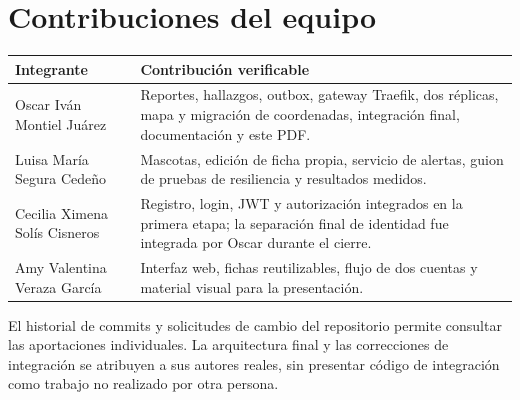 \documentclass[11pt,letterpaper]{article}
\begin{document}
\section{Contribuciones del equipo}
\small\begin{tabularx}{\textwidth}{@{}p{3.8cm}Y@{}}\toprule
Integrante & Contribución verificable \\\midrule
Oscar Iván Montiel Juárez & Reportes, hallazgos, outbox, gateway Traefik, dos réplicas, mapa y migración de coordenadas, integración final, documentación y este PDF. \\
Luisa María Segura Cedeño & Mascotas, edición de ficha propia, servicio de alertas, guion de pruebas de resiliencia y resultados medidos. \\
Cecilia Ximena Solís Cisneros & Registro, login, JWT y autorización integrados en la primera etapa; la separación final de identidad fue integrada por Oscar durante el cierre. \\
Amy Valentina Veraza García & Interfaz web, fichas reutilizables, flujo de dos cuentas y material visual para la presentación. \\\bottomrule
\end{tabularx}\par\medskip
El historial de commits y solicitudes de cambio del repositorio permite consultar las aportaciones individuales. La arquitectura final y las correcciones de integración se atribuyen a sus autores reales, sin presentar código de integración como trabajo no realizado por otra persona.
\end{document}
